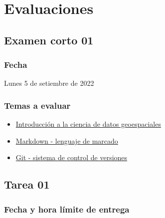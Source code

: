 \documentclass[
  letterpaper,
  DIV=11,
  numbers=noendperiod]{scrreprt}
\providecommand{\tightlist}{%
  \setlength{\itemsep}{0pt}\setlength{\parskip}{0pt}}\usepackage{longtable,booktabs,array}
\begin{document}
\part{Evaluaciones}

\hypertarget{examen-corto-01}{%
\chapter*{Examen corto 01}\label{examen-corto-01}}

\hypertarget{fecha}{%
\section*{Fecha}\label{fecha}}

Lunes 5 de setiembre de 2022

\hypertarget{temas-a-evaluar}{%
\section*{Temas a evaluar}\label{temas-a-evaluar}}

\begin{itemize}
\tightlist
\item
  \href{https://pf0953-programacionr.github.io/2022-ii/01-introduccion-ciencia-datos-geoespaciales.html}{Introducción
  a la ciencia de datos geoespaciales}
\item
  \href{https://pf0953-programacionr.github.io/2022-ii/02-markdown.html}{Markdown
  - lenguaje de marcado}
\item
  \href{https://pf0953-programacionr.github.io/2022-ii/03-git.html}{Git
  - sistema de control de versiones}
\end{itemize}

\hypertarget{tarea-01}{%
\chapter*{Tarea 01}\label{tarea-01}}

\hypertarget{fecha-y-hora-luxedmite-de-entrega}{%
\section*{Fecha y hora límite de
entrega}\label{fecha-y-hora-luxedmite-de-entrega}}
\end{document}
